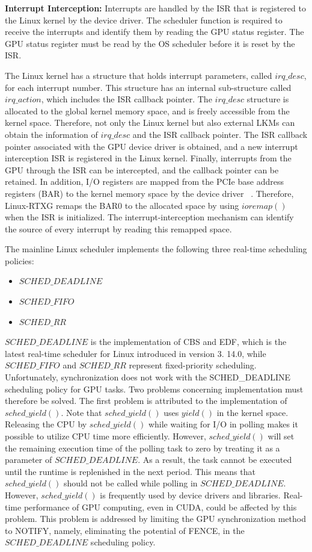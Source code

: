 \textbf{Interrupt Interception:} Interrupts are handled by the ISR that is registered to the Linux kernel by the device driver.
The scheduler function is required to receive the interrupts and identify them by reading the GPU status register.
The GPU status register must be read by the OS scheduler before it is reset by the ISR.

The Linux kernel has a structure that holds interrupt parameters, called $irq\_desc$, for each interrupt number.
This structure has an internal sub-structure called $irq\_action$, which includes the ISR callback pointer.
The $irq\_desc$ structure is allocated to the global kernel memory space, and is freely accessible from the kernel space.
Therefore, not only the Linux kernel but also external LKMs can obtain the information of $irq\_desc$ and the ISR callback pointer.
The ISR callback pointer associated with the GPU device driver is obtained, and a new interrupt interception ISR is registered in the Linux kernel.
Finally, interrupts from the GPU through the ISR can be intercepted, and the callback pointer can be retained.
In addition, I/O registers are mapped from the PCIe base address registers (BAR) to the kernel memory space by the device driver ~\cite{fujii:icpads2013,kato2013zero}.
Therefore, Linux-RTXG remaps the BAR0 to the allocated space by using $ioremap()$ when the ISR is initialized.
The interrupt-interception mechanism can identify the source of every interrupt by reading this remapped space.


The mainline Linux scheduler implements the following three real-time scheduling policies:
\begin{itemize}
\item $SCHED\_DEADLINE$
\item $SCHED\_FIFO$
\item $SCHED\_RR$
\end{itemize}

$SCHED\_DEADLINE$ is the implementation of CBS and EDF, which is the latest real-time scheduler for Linux introduced in version 3.
14.0, while $SCHED\_FIFO$ and $SCHED\_RR$ represent fixed-priority scheduling.
Unfortunately, synchronization does not work with the SCHED\_DEADLINE scheduling policy for GPU tasks.
Two problems concerning implementation must therefore be solved.
The first problem is attributed to the implementation of $sched\_yield()$.
Note that $sched\_yield()$ uses $yield()$ in the kernel space.
Releasing the CPU by $sched\_yield()$ while waiting for I/O in polling makes it possible to utilize CPU time more efficiently.
However, $sched\_yield()$ will set the remaining execution time of the polling task to zero by treating it as a parameter of $SCHED\_DEADLINE$.
As a result, the task cannot be executed until the runtime is replenished in the next period.
This means that $sched\_yield()$ should not be called while polling in $SCHED\_DEADLINE$.
However, $sched\_yield()$ is frequently used by device drivers and libraries.
Real-time performance of GPU computing, even in CUDA, could be affected by this problem.
This problem is addressed by limiting the GPU synchronization method to NOTIFY, namely, eliminating the potential of FENCE, in the $SCHED\_DEADLINE$ scheduling policy.

